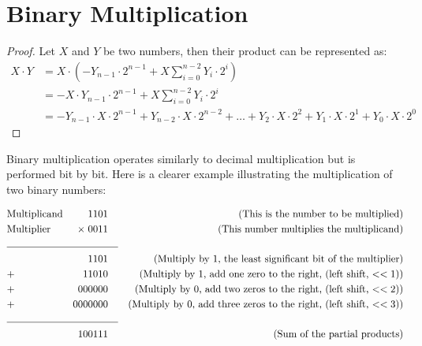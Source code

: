 \documentclass[12pt,openany]{book}
\begin{document}
		
		\section{Binary Multiplication}
		
		\begin{proof}[Proof]
			Let $X$ and $Y$ be two numbers, then their product can be represented as:
			\begin{align*}
				X \cdot Y & = X \cdot \left( -Y_{n-1} \cdot 2^{n-1} + X \sum_{i=0}^{n-2} Y_i \cdot 2^i \right)                                                                \\
				          & = -X \cdot Y_{n-1} \cdot 2^{n-1} + X \sum_{i=0}^{n-2} Y_i \cdot 2^i                                                                               \\
				          & = -Y_{n-1} \cdot X \cdot 2^{n-1} + Y_{n-2} \cdot X \cdot 2^{n-2} + \ldots + Y_2 \cdot X \cdot 2^2 + Y_1 \cdot X \cdot 2^1 + Y_0 \cdot X \cdot 2^0 
			\end{align*}
		\end{proof}
		    
		Binary multiplication operates similarly to decimal multiplication but is performed bit by bit. Here is a clearer example illustrating the multiplication of two binary numbers:
		
		\begin{align*}
			  & \text{Multiplicand} & 1101           & \quad & \text{(This is the number to be multiplied)}                              \\
			  & \text{Multiplier}   & \times \; 0011 &       & \text{(This number multiplies the multiplicand)}                          \\
			\cline{2-4}
			  &                     & 1101           &       & \text{(Multiply by 1, the least significant bit of the multiplier)}       \\
			  & +                   & 11010          &       & \text{(Multiply by 1, add one zero to the right, (left shift, $<<1$))}    \\
			  & +                   & 000000         &       & \text{(Multiply by 0, add two zeros to the right, (left shift, $<<2$))}   \\
			  & +                   & 0000000        &       & \text{(Multiply by 0, add three zeros to the right, (left shift, $<<3$))} \\
			\cline{2-4}
			  &                     & 100111         &       & \text{(Sum of the partial products)}                                      
		\end{align*}
		
\end{document}
